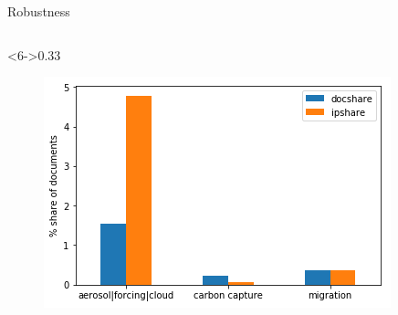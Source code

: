 \documentclass[9pt]{beamer}
\begin{document}
\begin{frame}{Robustness}
\begin{columns}
	\begin{column}<6->{0.33\linewidth}
		\begin{figure}
			\includegraphics[width=\linewidth]{../plots/ipcc_rep_simple}
		\end{figure}
	\end{column}
\end{columns}

\end{frame}
\end{document}
